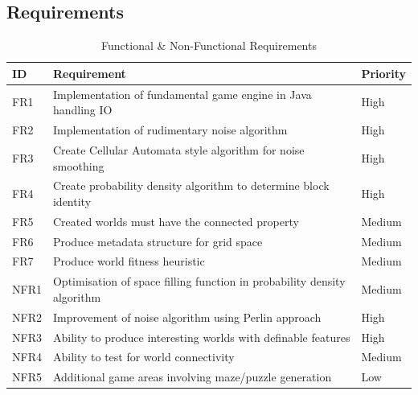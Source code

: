 \documentclass[12pt,a4paper]{article}
\begin{document}
\subsection{Requirements}

\begin{table}[h!]
\centering
\begin{tabular}{l|l|l}
\textbf{ID}  & \textbf{Requirement}                                           & \textbf{Priority} \\ \hline
FR1 & Implementation of fundamental game engine in Java handling IO    & High     \\
FR2 & Implementation of rudimentary noise algorithm                         & High     \\
FR3 & Create Cellular Automata style algorithm for noise smoothing     & High     \\
FR4 & Create probability density algorithm to determine block identity & High     \\
FR5 & Created worlds must have the connected property    			   & Medium    \\
FR6 & Produce metadata structure for grid space                        & Medium   \\
FR7 & Produce world fitness heuristic                                  & Medium  \\ \hline

NFR1 & Optimisation of space filling function in probability density algorithm    & Medium    \\
NFR2 & Improvement of noise algorithm using Perlin approach & High \\
NFR3 & Ability to produce interesting worlds with definable features & High \\
NFR4 & Ability to test for world connectivity            & Medium     \\
NFR5 & Additional game areas involving maze/puzzle generation & Low \\  

\end{tabular}
\caption{Functional \& Non-Functional Requirements}

\label{table:1}
\end{table}
\end{document}
